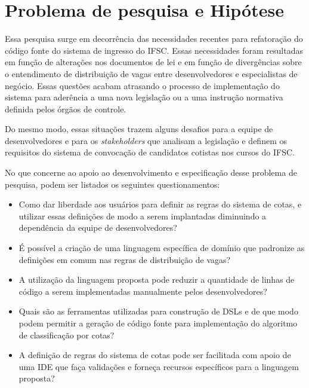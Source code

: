 \section{Problema de pesquisa e Hipótese}
\label{problema}

Essa pesquisa surge em decorrência das necessidades recentes para refatoração do código fonte do sistema de ingresso do \gls{IFSC}. Essas necessidades foram resultadas em função de alterações nos documentos de lei e em função de  divergências sobre o entendimento de distribuição de vagas entre desenvolvedores e especialistas de negócio. Essas questões acabam atrasando o processo de implementação do sistema para aderência a uma nova legislação ou a uma instrução normativa definida pelos órgãos de controle.

Do mesmo modo, essas situações trazem alguns desafios para a equipe de desenvolvedores e para os \textit{stakeholders} que analisam a legislação e definem os requisitos do sistema de convocação de candidatos cotistas nos cursos do \gls{IFSC}. 

No que concerne ao apoio ao desenvolvimento e especificação desse problema de pesquisa, podem ser listados os seguintes questionamentos:

\begin{itemize}
    \item Como dar liberdade aos usuários para definir as regras do sistema de cotas, e utilizar essas definições de modo a serem implantadas diminuindo a dependência da equipe de  desenvolvedores?
    
    \item É possível a criação de uma linguagem específica de domínio que padronize as definições em comum nas regras de distribuição de vagas?
    
    \item A utilização da linguagem proposta pode reduzir a quantidade de linhas de código a serem implementadas manualmente pelos desenvolvedores?
    
    \item Quais são as ferramentas utilizadas para construção de \gls{DSL}s e de que modo podem permitir a geração de código fonte para implementação do algoritmo de classificação por cotas?
    
    \item A definição de regras do sistema de cotas pode ser facilitada com apoio de uma \gls{IDE} que faça validações e forneça recursos específicos para a linguagem proposta?
    

    
\end{itemize}{}